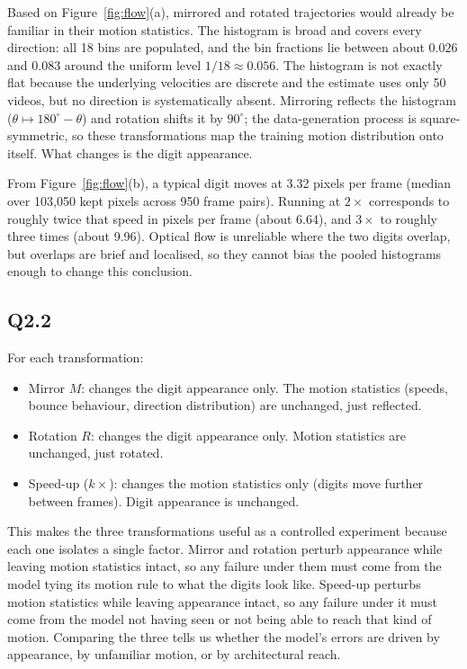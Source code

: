 \documentclass[11pt,letterpaper]{article}
\begin{document}
Based on Figure~\ref{fig:flow}(a), mirrored and rotated trajectories would already be familiar in their motion statistics. The histogram is broad and covers every direction: all 18 bins are populated, and the bin fractions lie between about $0.026$ and $0.083$ around the uniform level $1/18 \approx 0.056$. The histogram is not exactly flat because the underlying velocities are discrete and the estimate uses only 50 videos, but no direction is systematically absent. Mirroring reflects the histogram ($\theta \mapsto 180^\circ-\theta$) and rotation shifts it by $90^\circ$; the data-generation process is square-symmetric, so these transformations map the training motion distribution onto itself. What changes is the digit appearance.

From Figure~\ref{fig:flow}(b), a typical digit moves at 3.32 pixels per frame (median over 103{,}050 kept pixels across 950 frame pairs). Running at $2\times$ corresponds to roughly twice that speed in pixels per frame (about 6.64), and $3\times$ to roughly three times (about 9.96). Optical flow is unreliable where the two digits overlap, but overlaps are brief and localised, so they cannot bias the pooled histograms enough to change this conclusion.

\subsection*{Q2.2}

For each transformation:

\begin{itemize}
  \item {Mirror $M$:} changes the {digit appearance} only. The motion statistics (speeds, bounce behaviour, direction distribution) are unchanged, just reflected.
  \item {Rotation $R$:} changes the {digit appearance} only. Motion statistics are unchanged, just rotated.
  \item {Speed-up ($k\times$):} changes the {motion statistics} only (digits move further between frames). Digit appearance is unchanged.
\end{itemize}

This makes the three transformations useful as a controlled experiment because each one isolates a single factor. Mirror and rotation perturb appearance while leaving motion statistics intact, so any failure under them must come from the model tying its motion rule to what the digits look like. Speed-up perturbs motion statistics while leaving appearance intact, so any failure under it must come from the model not having seen or not being able to reach that kind of motion. Comparing the three tells us whether the model's errors are driven by appearance, by unfamiliar motion, or by architectural reach.
\end{document}
